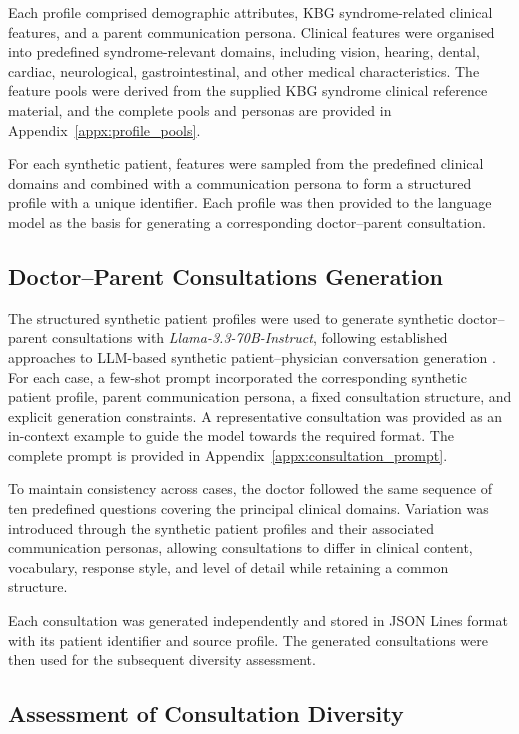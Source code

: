 \documentclass[ %
                    author={Aman Kumar Singh},
                supervisor={Dr. Edwin Simpson},
                    degree={MSc},
                     title={Quality-Aware Knowledge Distillation of Large Language Models for Efficient Personalised Clinical Report Generation},
                  subtitle={},
                      type={},
                      year={2021}]{dissertation}
\begin{document}
Each profile comprised demographic attributes, KBG syndrome-related clinical
features, and a parent communication persona. Clinical features were
organised into predefined syndrome-relevant domains, including vision,
hearing, dental, cardiac, neurological, gastrointestinal, and other medical
characteristics. The feature pools were derived from the supplied KBG
syndrome clinical reference material, and the complete pools and personas
are provided in Appendix~\ref{appx:profile_pools}.

For each synthetic patient, features were sampled from the predefined
clinical domains and combined with a communication persona to form a
structured profile with a unique identifier. Each profile was then provided
to the language model as the basis for generating a corresponding
doctor--parent consultation.

\subsection{Doctor--Parent Consultations Generation}
\label{sec:consultation_generation}
The structured synthetic patient profiles were used to generate synthetic
doctor--parent consultations with \textit{Llama-3.3-70B-Instruct},
following established approaches to LLM-based synthetic patient--physician
conversation generation \cite{haider_synthetic_2025}. For each case, a
few-shot prompt incorporated the corresponding synthetic patient profile,
parent communication persona, a fixed consultation structure, and explicit
generation constraints. A representative consultation was provided as an
in-context example to guide the model towards the required format. The
complete prompt is provided in Appendix~\ref{appx:consultation_prompt}.

To maintain consistency across cases, the doctor followed the same sequence
of ten predefined questions covering the principal clinical domains.
Variation was introduced through the synthetic patient profiles and their
associated communication personas, allowing consultations to differ in
clinical content, vocabulary, response style, and level of detail while
retaining a common structure.

Each consultation was generated independently and stored in JSON Lines
format with its patient identifier and source profile. The generated
consultations were then used for the subsequent diversity assessment.

\subsection{Assessment of Consultation Diversity}
\label{sec:consultation_diversity}
\end{document}
